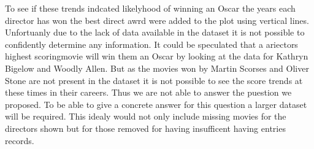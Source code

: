 \documentclass[]{article}
\begin{document}
To see if these trends indcated likelyhood of winning an Oscar the years
each director has won the best direct awrd were added to the plot using
vertical lines. Unfortuanly due to the lack of data available in the
dataset it is not possible to confidently determine any information. It
could be speculated that a ariectors highest scoringmovie will win them
an Oscar by looking at the data for Kathryn Bigelow and Woodly Allen.
But as the movies won by Martin Scorses and Oliver Stone are not present
in the dataset it is not possible to see the score trends at these times
in their careers. Thus we are not able to answer the puestion we
proposed. To be able to give a concrete answer for this question a
larger dataset will be required. This idealy would not only include
missing movies for the directors shown but for those removed for having
insufficent having entries records.
\end{document}
